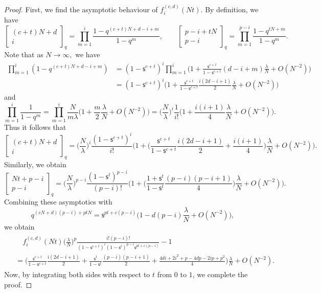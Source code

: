\documentclass[10pt,a4paper]{amsart}
\newcommand{\qbinom}[2]{{\begin{bmatrix}#1\\#2\end{bmatrix}}_q}
\begin{document}
\begin{proof}
    First, we find the asymptotic behaviour of $f_{i}^{(c,d)}(Nt)$. By definition, we have
    \begin{equation*}
        \qbinom{(c+t)N+d}{i}=\prod_{m=1}^{i}\frac{1-q^{(c+t)N+d-i+m}}{1-q^{m}}, \qquad  \qbinom{p-i+tN}{p-i}=\prod_{m=1}^{p-i}\frac{1-q^{tN+m}}{1-q^{m}}. 
    \end{equation*}
    Note that as $N \to \infty,$ we have 
    \begin{equation*}
    \begin{split}
        \prod_{m=1}^{i}(1-q^{(c+t)N+d-i+m})
        &=(1-\mathsf{s}^{c+t})^{i}\prod_{m=1}^{i}\Big(1+\frac{\mathsf{s}^{c+t}}{1-\mathsf{s}^{c+t}}(d-i+m)\frac{\lambda}{N}+O(N^{-2})\Big)\\
        &=(1-\mathsf{s}^{c+t})^{i}\Big(1+\frac{\mathsf{s}^{c+t}}{1-\mathsf{s}^{c+t} }\frac{i(2d-i+1)}{2}\frac{\lambda}{N}+O(N^{-2})\Big)
    \end{split}
    \end{equation*}
    and
    \begin{equation*}
        \prod_{m=1}^{i}\frac{1}{1-q^{m}}=\prod_{m=1}^{i}\frac{N}{m\lambda}\Big(1+\frac{m}{2}\frac{\lambda}{N}+O(N^{-2})\Big)=\Big(\frac{N}{\lambda}\Big)^{i}\frac{1}{i!}\Big(1+\frac{i(i+1)}{4}\frac{\lambda}{N}+O(N^{-2})\Big).
    \end{equation*}
    Thus it follows that
    \begin{equation*}
        \qbinom{(c+t)N+d}{i}=\Big(\frac{N}{\lambda}\Big)^{i} \frac{(1-\mathsf{s}^{c+t})^{i}}{i!}\Big(1+\Big(\frac{\mathsf{s}^{c+t}}{1-\mathsf{s}^{c+t}}\frac{i(2d-i+1)}{2}+\frac{i(i+1)}{4}\Big)\frac{\lambda}{N}+O(N^{-2})\Big).
    \end{equation*} 
    Similarly, we obtain
    \begin{equation*}
        \qbinom{Nt+p-i}{p-i}=\Big(\frac{N}{\lambda}\Big)^{p-i}\frac{(1-\mathsf{s}^{t})^{p-i}}{(p-i)!}\Big(1+\Big(\frac{1+\mathsf{s}^{t} }{1-\mathsf{s}^{t}} \frac{(p-i)(p-i+1)}{4}\Big)\frac{\lambda}{N}+O(N^{-2})\Big).
    \end{equation*}
    Combining these asymptotics with
    \begin{equation*}
        q^{(cN+d)(p-i)+ptN}
        =\mathsf{s}^{pt+c(p-i)}\Big(1-d(p-i)\frac{\lambda}{N}+O(N^{-2})\Big),
    \end{equation*}
    we obtain  
    \begin{align} \label{eqn:f(Nt) asymptotic}
    \begin{split}
      &\quad f_{i}^{(c,d)}(Nt) \Big(\frac{\lambda}{N}\Big)^{p}\frac{i!(p-i)!}{(1-\mathsf{s}^{c+t})^{i}(1-\mathsf{s}^{t})^{p-i}\mathsf{s}^{pt+c(p-i)}} -1
        \\
        &=\bigg(\frac{\mathsf{s}^{c+t}}{1-\mathsf{s}^{c+t}}\frac{i(2d-i+1)}{2}+\frac{\mathsf{s}^{t}}{1-\mathsf{s}^{t}}\frac{(p-i)(p-i+1)}{2}+\frac{4di+2i^{2}+p-4dp-2ip+p^{2}}{4}\bigg)\frac{\lambda}{N}  +O(N^{-2}). 
    \end{split}
    \end{align} 
    Now, by integrating both sides with respect to $t$ from $0$ to $1$, we complete the proof.
\end{proof}
\end{document}

